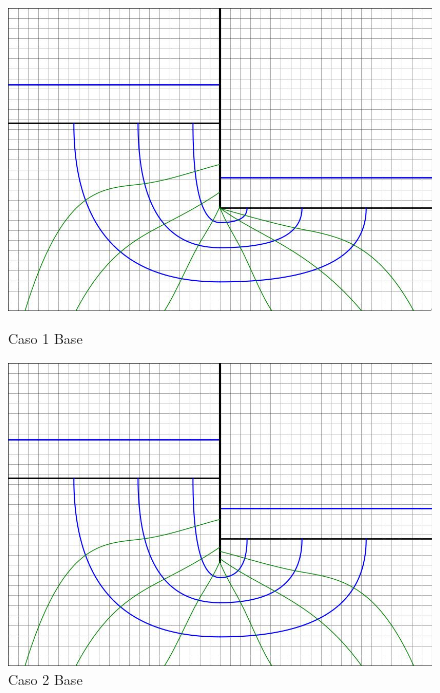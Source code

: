 \documentclass{article}
\begin{document}
\begin{figure}[H]
  \centering
  \begin{minipage}{0.32\textwidth}
      \centering
      \includegraphics[width=\textwidth]{FOTOS/caso_1dibujo_base.jpg}
      \caption{Caso 1 Base}
  \end{minipage}
  \begin{minipage}{0.32\textwidth}
      \centering
      \includegraphics[width=\textwidth]{FOTOS/caso_2dibujo_base.jpg}
      \caption{Caso 2 Base}
  \end{minipage}
  \begin{minipage}{0.32\textwidth}
      \centering

\end{minipage}
\end{figure}
\end{document}
